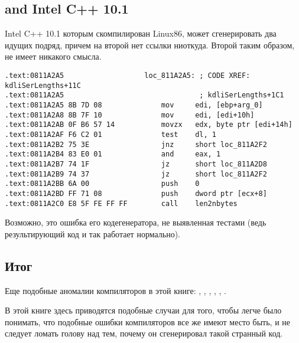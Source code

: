 \label{anomaly:Intel}
\myindex{\CompilerAnomaly}

\subsection{ and Intel C++ 10.1}

\myindex{\oracle}

Intel C++ 10.1 которым скомпилирован  Linux86, может сгенерировать два \JZ идущих подряд, 
причем на второй \JZ нет ссылки ниоткуда. Второй \JZ таким образом, не имеет никакого смысла.



\begin{lstlisting}[caption=оттуда же,style=customasmx86]
.text:0811A2A5                   loc_811A2A5: ; CODE XREF: kdliSerLengths+11C
.text:0811A2A5                                ; kdliSerLengths+1C1
.text:0811A2A5 8B 7D 08              mov     edi, [ebp+arg_0]
.text:0811A2A8 8B 7F 10              mov     edi, [edi+10h]
.text:0811A2AB 0F B6 57 14           movzx   edx, byte ptr [edi+14h]
.text:0811A2AF F6 C2 01              test    dl, 1
.text:0811A2B2 75 3E                 jnz     short loc_811A2F2
.text:0811A2B4 83 E0 01              and     eax, 1
.text:0811A2B7 74 1F                 jz      short loc_811A2D8
.text:0811A2B9 74 37                 jz      short loc_811A2F2
.text:0811A2BB 6A 00                 push    0
.text:0811A2BD FF 71 08              push    dword ptr [ecx+8]
.text:0811A2C0 E8 5F FE FF FF        call    len2nbytes
\end{lstlisting}

Возможно, это ошибка его кодегенератора, не выявленная тестами 
(ведь результирующий код и так работает нормально).



\subsection{Итог}

Еще подобные аномалии компиляторов в этой книге: 
, , ,
,
,
.

В этой книге здесь приводятся подобные случаи для того, чтобы легче было понимать, 
что подобные ошибки компиляторов 
все же имеют место быть, и не следует ломать голову над тем, почему он сгенерировал такой странный код.

